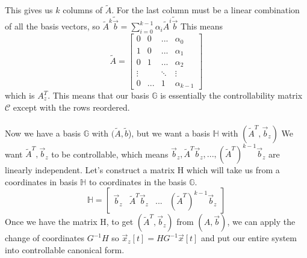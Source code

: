 \documentclass{article}
\begin{document}
This gives us $k$ columns of $\tilde{A}$. For the last column must be a linear combination of all the basis vectors, so $\tilde{A}^k\tilde{\vec{b}}=\sum_{i=0}^{k-1}{\alpha_i\tilde{A}^i\tilde{\vec{b}}}$
This means
\[
    \tilde{A} = \left[
        \begin{array}{cccc}
            0 & 0 & ... & \alpha_0\\
            1 & 0 & ... & \alpha_1\\
            0 & 1 & ... & \alpha_2\\
            \vdots & & \ddots & \vdots\\
            0 & ... & 1 & \alpha_{k-1}
        \end{array}
    \right]
    \]
which is $A_z^T$.
This means that our basis $\mathbb{G}$ is essentially the controllability matrix $\mathcal{C}$ except with the rows reordered.
\\\\Now we have a basis $\mathbb{G}$ with $(\tilde{A}, \tilde{b}$), but we want a basis $\mathbb{H}$ with $(\tilde{A}^T, \vec{b}_z)$
We want $\tilde{A}^T, \vec{b}_z$ to be controllable, which means $\vec{b}_z, \tilde{A}^T\vec{b}_z,...,(\tilde{A}^T)^{k-1}\vec{b}_z$ are linearly independent.
Let's construct a matrix H which will take us from a coordinates in basis $\mathbb{H}$ to coordinates in the basis $\mathbb{G}$. 
\[
    \mathbb{H} = \left[
        \begin{array}{c|c|c|c}
            \vec{b}_z & \tilde{A}^T\vec{b}_z & ... &(\tilde{A}^T)^{k-1}\vec{b}_z
        \end{array}
    \right]
\]
Once we have the matrix H, to get $(\tilde{A}^T, \vec{b}_z)$ from $(A, \vec{b})$,
we can apply the change of coordinates $G^{-1}H$ so $\vec{x}_z[t]=HG^{-1}\vec{x}[t]$ and put our entire system into controllable canonical form.
\end{document}

